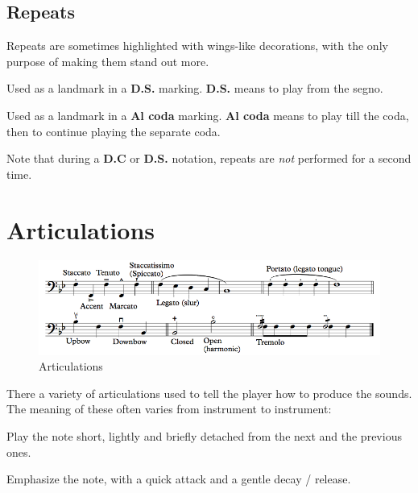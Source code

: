 \subsection{Repeats}
Repeats are sometimes highlighted with wings-like decorations, with the only purpose of making them stand out more.

\begin{definition}[Segno]
    Used as a landmark in a \textbf{D.S.} marking. \textbf{D.S.} means to play from the segno.
\end{definition}

\begin{definition}[Coda]
    Used as a landmark in a \textbf{Al coda} marking. \textbf{Al coda} means to play till the coda, then to continue playing the separate coda.
\end{definition}

Note that during a \textbf{D.C} or \textbf{D.S.} notation, repeats are \emph{not} performed for a second time.

\section{Articulations}
\begin{figure}[h]
    \begin{center}
        \includegraphics[width=1\textwidth]{img/articulations}
        \caption{Articulations}
    \end{center}
\end{figure}
There a variety of articulations used to tell the player how to produce the sounds. The meaning of these often varies from instrument to instrument:

\begin{definition}[Staccato]
    Play the note short, lightly and briefly detached from the next and the previous ones.
\end{definition}

\begin{definition}[Accent]
    Emphasize the note, with a quick attack and a gentle decay / release.
\end{definition}

